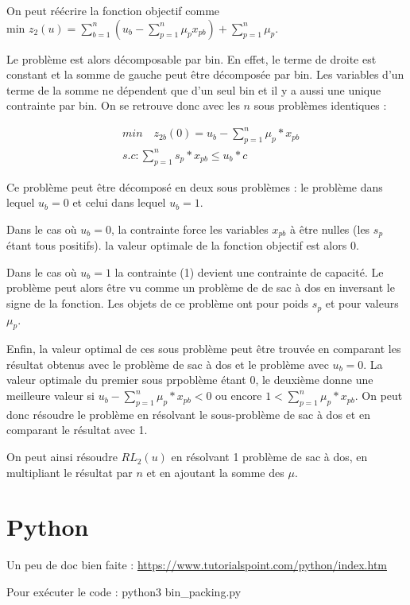 \documentclass{article}
\begin{document}
On peut réécrire la fonction objectif comme $\text{min } z_2(u) =  \sum \limits_{b = 1}^{n} \left( u_b - \sum \limits_{p = 1}^{n} \mu_p x_{pb} \right) + \sum \limits_{p = 1}^{n} \mu_p$.\newline

Le problème est alors décomposable par bin. En effet, le terme de droite est constant et la somme de gauche peut être décomposée par bin. Les variables d'un terme de la somme ne dépendent que d'un seul bin et il y a aussi une unique contrainte par bin. On se retrouve donc avec les $n$ sous problèmes identiques :

\begin{align*}
    &min \quad z_{2b}(0) = u_b - \sum \limits_{p=1}^n \mu_p*x_{pb}\\
    &s.c: \sum \limits_{p=1}^n s_p*x_{pb} \leq u_b*c
\end{align*}

Ce problème peut être décomposé en deux sous problèmes : le problème dans lequel $u_b = 0$ et celui dans lequel $u_b = 1$.\newline

Dans le cas où $u_b = 0$, la contrainte force les variables $x_{pb}$ à être nulles (les $s_p$ étant tous positifs).
la valeur optimale de la fonction objectif est alors $0$. \newline

Dans le cas où $u_b = 1$ la contrainte (1) devient une contrainte de capacité.
Le problème peut alors être vu comme un problème de de sac à dos en inversant le signe de la fonction.
Les objets de ce problème ont pour poids $s_p$ et pour valeurs $\mu_p$. \newline

Enfin, la valeur optimal de ces sous problème peut être trouvée en comparant les résultat obtenus avec le problème de sac à dos et le problème avec $u_b = 0$.
La valeur optimale du premier sous prpoblème étant $0$, le deuxième donne une meilleure valeur si $u_b - \sum_{p=1}^n \mu_p*x_{pb} < 0$ ou encore $1 < \sum_{p=1}^n \mu_p*x_{pb}$.
On peut donc résoudre le problème en résolvant le sous-problème de sac à dos et en comparant le résultat avec 1.\newline

On peut ainsi résoudre $RL_2(u)$ en résolvant 1 problème de sac à dos, en multipliant le résultat par $n$ et en ajoutant la somme des $\mu$. 

\section{Python}

Un peu de doc bien faite : \url{https://www.tutorialspoint.com/python/index.htm} \newline

Pour exécuter le code : python3 bin\_packing.py
\end{document}

